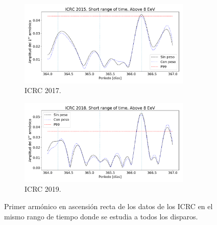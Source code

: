         \begin{figure}[H]
          \begin{subfigure}[b]{0.5\textwidth}
          \centering
            \includegraphics[width=0.9\textwidth]{../0_Introduccion/ICRC/ICRC_2017_Short_time_Above_8_EeV.png}
            \caption{ICRC 2017.}  \label{fig:8EeV_short_range_ICRC2017}
          \end{subfigure}%
          \begin{subfigure}[b]{0.5\textwidth}
          \centering
            \includegraphics[width=0.9\textwidth]{../0_Introduccion/ICRC/ICRC_2019_Short_time_Above_8_EeV.png}
            \caption{ICRC 2019.}  \label{fig:8EeV_short_range_ICRC2019}
          \end{subfigure}
          \caption{Primer armónico en ascensión recta de los datos de los ICRC en el mismo rango de tiempo donde se estudia a todos los disparos.}
        \end{figure}



